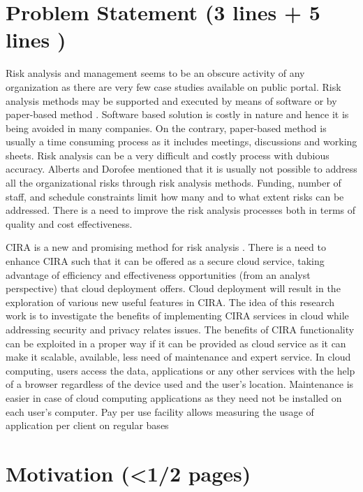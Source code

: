 \documentclass[a4paper,twoside,10pt]{report}
\begin{document}
\section{Problem Statement (3 lines + 5 lines )}\label{ProbStat}

Risk analysis and management seems to be an obscure activity of any organization as there are very few case studies available on public portal. Risk analysis methods may be supported and executed by means of software \cite{jenkins1998} or by paper-based method \cite{isf1997}. Software based solution is costly in nature and hence it is being avoided in many companies. On the contrary, paper-based method is usually a time consuming process as it includes meetings, discussions and working sheets. Risk analysis can be a very difficult and costly process with dubious accuracy.  Alberts and Dorofee \cite{Alberts:2002:MIS:581794} mentioned that it is usually not possible to address all the organizational risks through risk analysis methods. Funding, number of staff, and schedule constraints limit how many and to what extent risks can be addressed. There is a need to improve the risk analysis processes both in terms of quality and cost effectiveness.  

CIRA is a new and promising method for risk analysis \cite{lisaB}.  There is a need to enhance CIRA such that it can be offered as a secure cloud service, taking advantage of efficiency and effectiveness opportunities (from an analyst perspective) that cloud deployment offers. Cloud deployment will result in the exploration of various new useful features in CIRA. The idea of this research work is to investigate the benefits of implementing CIRA services in cloud while addressing security and privacy relates issues. The benefits of CIRA functionality can be exploited in a proper way if it can be provided as cloud service as it can make it scalable, available, less need of maintenance and expert service. In cloud computing, users access the data, applications or any other services with the help of a browser regardless of the device used and the user's location. Maintenance is easier in case of cloud computing applications as they need not be installed on each user's computer. Pay per use facility allows measuring the usage of application per client on regular bases \cite{6203873}

\section{Motivation (<1/2 pages)}\label{Motivation}
\end{document}
